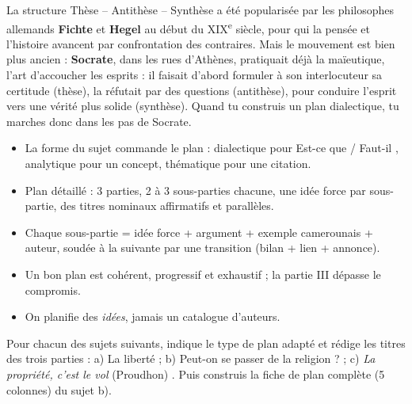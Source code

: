 \documentclass[11pt]{article}
\newcommand{\cle}[1]{{\popxbold\color{popdark}#1}}
\begin{document}
\begin{savaistu}
La structure Thèse -- Antithèse -- Synthèse a été popularisée par les philosophes allemands \textbf{Fichte} et \textbf{Hegel} au début du XIX\textsuperscript{e} siècle, pour qui la pensée et l'histoire avancent par confrontation des contraires. Mais le mouvement est bien plus ancien : \textbf{Socrate}, dans les rues d'Athènes, pratiquait déjà la \cle{maïeutique}, l'art d'\og accoucher les esprits \fg{} : il faisait d'abord formuler à son interlocuteur sa certitude (thèse), la réfutait par des questions (antithèse), pour conduire l'esprit vers une vérité plus solide (synthèse). Quand tu construis un plan dialectique, tu marches donc dans les pas de Socrate.
\end{savaistu}

\begin{aretenir}
\begin{itemize}
\item La forme du sujet commande le plan : dialectique pour \og Est-ce que / Faut-il \fg{}, analytique pour un concept, thématique pour une citation.
\item Plan détaillé : 3 parties, 2 à 3 sous-parties chacune, une idée force par sous-partie, des titres nominaux affirmatifs et parallèles.
\item Chaque sous-partie = idée force + argument + exemple camerounais + auteur, soudée à la suivante par une transition (bilan + lien + annonce).
\item Un bon plan est cohérent, progressif et exhaustif ; la partie III dépasse le compromis.
\item On planifie des \emph{idées}, jamais un catalogue d'auteurs.
\end{itemize}
\end{aretenir}

\begin{exercice}
Pour chacun des sujets suivants, indique le type de plan adapté et rédige les titres des trois parties : a) \og La liberté \fg{} ; b) \og Peut-on se passer de la religion ? \fg{} ; c) \og \emph{La propriété, c'est le vol} (Proudhon) \fg{}. Puis construis la fiche de plan complète (5 colonnes) du sujet b).
\end{exercice}
\end{document}
